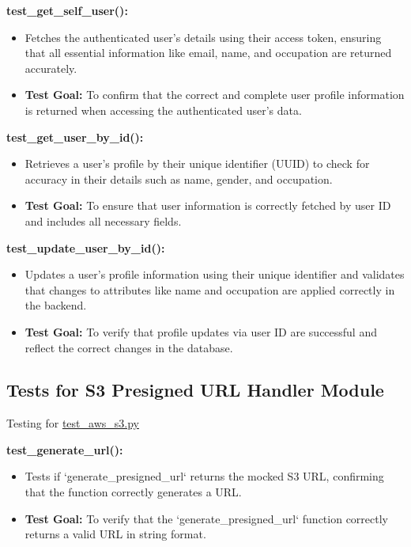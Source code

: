 \documentclass[12pt, titlepage]{article}
\begin{document}
\begin{enumerate}
\begin{enumerate}
\begin{enumerate}
\textbf{test\_get\_self\_user():}  
\begin{itemize}
    \item Fetches the authenticated user's details using their access token, ensuring that all essential information like email, name, and occupation are returned accurately.
    \item \textbf{Test Goal:} To confirm that the correct and complete user profile information is returned when accessing the authenticated user's data. 
    \newline
\end{itemize}

\textbf{test\_get\_user\_by\_id():}  
\begin{itemize}
    \item Retrieves a user’s profile by their unique identifier (UUID) to check for accuracy in their details such as name, gender, and occupation.
    \item \textbf{Test Goal:} To ensure that user information is correctly fetched by user ID and includes all necessary fields. 
    \newline
\end{itemize}

\textbf{test\_update\_user\_by\_id():}  
\begin{itemize}
    \item Updates a user’s profile information using their unique identifier and validates that changes to attributes like name and occupation are applied correctly in the backend.
    \item \textbf{Test Goal:} To verify that profile updates via user ID are successful and reflect the correct changes in the database. 
    \newline
\end{itemize}


\subsection{Tests for S3 Presigned URL Handler Module}
Testing for \href{https://github.com/RezaJodeiri/CXR-Capstone/blob/main/src/backend/test/test_aws_s3.py}{test\_aws\_s3.py}

\textbf{test\_generate\_url():}  
\begin{itemize}
    \item Tests if `generate\_presigned\_url` returns the mocked S3 URL, confirming that the function correctly generates a URL.
    \item \textbf{Test Goal:} To verify that the `generate\_presigned\_url` function correctly returns a valid URL in string format.
    \newline
    \newline
\end{itemize}


\end{enumerate}
\end{enumerate}
\end{enumerate}
\end{document}
